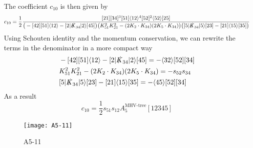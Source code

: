 The coefficient $c_{10}$ is then given by
\begin{equation*}
c_{10} = 
\frac{1}{2}\frac{[21][34]^3[51]\langle 12\rangle^4 [52]^2 \langle 52\rangle[25]}{\big(-[42][51]\langle 12\rangle - [2|\slashed{K}_{34}|2\rangle [45]\big)
\big( K_{51}^2 K_{21}^2 - (2K_2\cdot K_{34})(2K_5\cdot K_{34})\big)
\big( [5|\slashed{K}_{34}|5\rangle [23] - [21]\langle 15\rangle [35]\big)
}
\end{equation*}
Using Schouten identity and the momentum conservation, we can rewrite the terms in the denominator in a more compact way
\begin{equation*}
\begin{split}
& -[42][51]\langle 12\rangle - [2|\slashed{K}_{34}|2\rangle [45] = 
-\langle 32\rangle[52][34]
\\
& K_{51}^2 K_{21}^2 - (2K_2\cdot K_{34})(2K_5\cdot K_{34}) = 
-s_{52}s_{34}
\\
& [5|\slashed{K}_{34}|5\rangle [23] - [21]\langle 15\rangle [35]
= -\langle 45\rangle[52][34]
\end{split}
\end{equation*}
As a result
\begin{equation*}
c_{10} = \frac{1}{2}s_{51}s_{12}A_5^{\textrm{MHV-tree}}[12345]
\end{equation*}
%
%
\begin{figure}
  \centering
    \texttt{[image: A5-11]}
    \caption{A5-11}
  \label{A5-11}
\end{figure}
